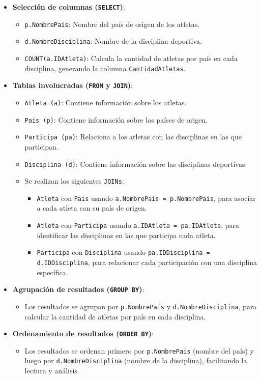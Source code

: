 \begin{itemize}
   \item \textbf{Selección de columnas (\texttt{SELECT})}:
   \begin{itemize}
       \item \texttt{p.NombrePais}: Nombre del país de origen de los atletas.
       \item \texttt{d.NombreDisciplina}: Nombre de la disciplina deportiva.
       \item \texttt{COUNT(a.IDAtleta)}: Calcula la cantidad de atletas por país en cada disciplina, generando la columna \texttt{CantidadAtletas}.
   \end{itemize}

   \item \textbf{Tablas involucradas (\texttt{FROM} y \texttt{JOIN})}:
   \begin{itemize}
       \item \texttt{Atleta (a)}: Contiene información sobre los atletas.
       \item \texttt{Pais (p)}: Contiene información sobre los países de origen.
       \item \texttt{Participa (pa)}: Relaciona a los atletas con las disciplinas en las que participan.
       \item \texttt{Disciplina (d)}: Contiene información sobre las disciplinas deportivas.
       \item Se realizan los siguientes \texttt{JOINs}:
       \begin{itemize}
           \item \texttt{Atleta} con \texttt{Pais} usando \texttt{a.NombrePais = p.NombrePais}, para asociar a cada atleta con su país de origen.
           \item \texttt{Atleta} con \texttt{Participa} usando \texttt{a.IDAtleta = pa.IDAtleta}, para identificar las disciplinas en las que participa cada atleta.
           \item \texttt{Participa} con \texttt{Disciplina} usando \texttt{pa.IDDisciplina = d.IDDisciplina}, para relacionar cada participación con una disciplina específica.
       \end{itemize}
   \end{itemize}

   \item \textbf{Agrupación de resultados (\texttt{GROUP BY})}:
   \begin{itemize}
       \item Los resultados se agrupan por \texttt{p.NombrePais} y \texttt{d.NombreDisciplina}, para calcular la cantidad de atletas por país en cada disciplina.
   \end{itemize}

   \item \textbf{Ordenamiento de resultados (\texttt{ORDER BY})}:
   \begin{itemize}
       \item Los resultados se ordenan primero por \texttt{p.NombrePais} (nombre del país) y luego por \texttt{d.NombreDisciplina} (nombre de la disciplina), facilitando la lectura y análisis.
   \end{itemize}
\end{itemize}

